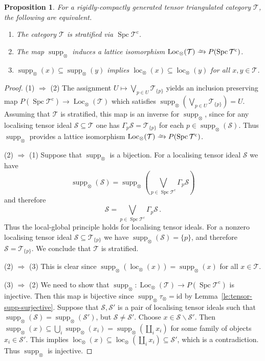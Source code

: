 \documentclass[10pt,a4paper]{amsart}
\newtheorem{proposition}{Proposition}
\newcommand{\Loc}{\operatorname{Loc}}
\newcommand{\Spc}{\operatorname{Spc}}
\newcommand{\cat}{\mathcal}
\newcommand{\id}{\mathrm{id}}
\newcommand{\iso}{\xrightarrow{\raisebox{-.6ex}[0ex][0ex]{$\scriptstyle{\sim}$}}}
\newcommand{\loc}{\operatorname{loc}}
\newcommand{\supp}{\operatorname{supp}}
\begin{document}
\begin{proposition}\label{pr:stratification-tensor}
For a rigidly-compactly generated tensor triangulated category $\cat T$, the
following are equivalent.
\begin{enumerate}
\item The category $\cat T$ is stratified via $\Spc\cat T^{\mathrm c}$.
\item The map $\supp_\otimes$ induces
  a lattice isomorphism $\Loc_\otimes(\cat T)\iso P(\Spc\cat T^{\mathrm c})$.
\item $\supp_\otimes(x)\subseteq\supp_\otimes(y)$ implies
  $\loc_\otimes(x)\subseteq\loc_\otimes(y)$ for all $x,y\in\cat T$.
\end{enumerate}
\end{proposition}

\begin{proof}
  (1) $\Rightarrow$ (2) The assignment
  $ U\mapsto \bigvee_{p\in U}\cat T_{\{p\}}$ yields an inclusion
  preserving map $P(\Spc\cat T^{\mathrm c})\to \Loc_\otimes(\cat T)$ which
  satisfies $\supp_\otimes(\bigvee_{p\in U}\cat T_{\{p\}})=U$.
  Assuming that $\cat T$ is stratified, this map is an inverse for
  $\supp_\otimes$, since for any localising tensor ideal
  $\cat S\subseteq\cat T$ one has $\Gamma_p\cat S=\cat T_{\{p\}}$ for
  each $p\in\supp_\otimes(\cat S)$. Thus $\supp_\otimes$ provides a
  lattice isomorphism $\Loc_\otimes(\cat T)\iso P(\Spc\cat T^{\mathrm c})$.

  (2) $\Rightarrow$ (1) Suppose that $\supp_\otimes$ is a
  bijection. For a localising tensor ideal $\cat S$ we have
\[\supp_\otimes(\cat S)=\supp_\otimes\left(\bigvee_{p\in\Spc\cat T^{\mathrm c}}\Gamma_p\cat S\right)\]
and therefore
\[\cat S=\bigvee_{p\in\Spc\cat T^{\mathrm c}}\Gamma_p\cat S\,.\]
Thus the local-global principle holds for localising tensor
ideals. For a nonzero localising tensor ideal
$\cat S\subseteq \cat T_{\{p\}}$ we have
$\supp_\otimes(\cat S)=\{p\}$, and therefore $\cat S=\cat T_{\{p\}}$. We
conclude that $\cat T$ is stratified.

(2) $\Rightarrow$ (3) This is clear since
$\supp_\otimes(\loc_\otimes (x))=\supp_\otimes(x)$ for all
$x\in\cat T$.

  (3) $\Rightarrow$ (2) We need to show that
  $\supp_\otimes\colon\Loc_\otimes(\cat T)\to P(\Spc\cat T^{\mathrm c})$ is
  injective. Then this map is bijective since
  $\supp_\otimes\tau_\otimes=\id$ by
  Lemma~\ref{le:tensor-supp-surjective}. Suppose that $\cat S,\cat S'$ is a
  pair of localising tensor ideals such that
  $\supp_\otimes(\cat S)= \supp_\otimes(\cat S')$, but
  $\cat S\neq\cat S'$. Choose $x\in\cat S\smallsetminus\cat S'$. Then
  $\supp_\otimes(x)\subseteq
  \bigcup_i\supp_\otimes(x_i)=\supp_\otimes(\coprod_i x_i)$ for some
  family of objects $x_i\in\cat S'$. This implies
  $\loc_\otimes(x)\subseteq\loc_\otimes(\coprod_i x_i)\subseteq\cat
  S'$, which is a contradiction. Thus $\supp_\otimes$ is injective.
\end{proof}
\end{document}
